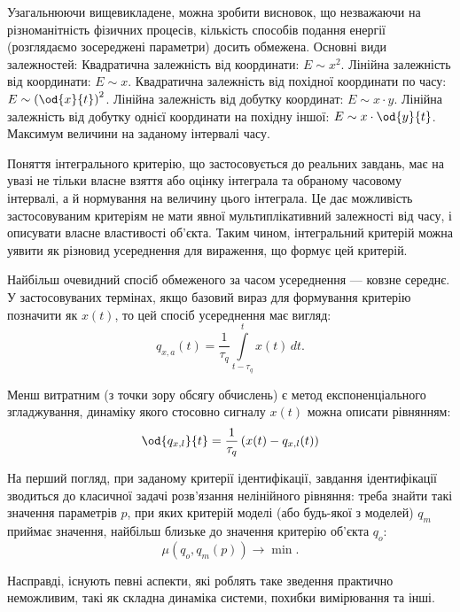 \documentclass[a4paper,13pt]{atuaref}
\begin{document}
Узагальнюючи вищевикладене, можна зробити висновок, що незважаючи на
різноманітність фізичних процесів, кількість способів подання енергії
(розглядаємо зосереджені параметри) досить обмежена. Основні види залежностей:
  Квадратична залежність від координати:
    $E \sim x^2$.
  Лінійна залежність від координати:
    $E \sim x$.
  Квадратична залежність від похідної координати по часу:
    $E \sim \left( \od{x}{t}\right)^2$.
  Лінійна залежність від добутку координат:
    $E \sim x \cdot y$.
    Лінійна залежність від добутку однієї координати на похідну іншої:
     $E \sim x \cdot \od{y}{t}$.
  Максимум величини на заданому інтервалі часу.

Поняття інтегрального критерію, що застосовується до реальних завдань, має на
увазі не тільки власне взяття або оцінку інтеграла та обраному часовому
інтервалі, а й нормування на величину цього інтеграла. Це дає можливість
застосовуваним критеріям не мати явної мультиплікативний залежності від часу, і
описувати власне властивості об'єкта. Таким чином, інтегральний критерій можна
уявити як різновид усереднення для вираження, що формує цей критерій.

Найбільш очевидний спосіб обмеженого за часом усереднення --- ковзне середнє. У
застосовуваних термінах, якщо базовий вираз для формування критерію позначити як
$ x(t)$, то цей спосіб усереднення має вигляд:
%
\begin{equation}
  q_{x,a}(t) =
  \frac{1}{\tau_q}
  \int\limits_{t-\tau_q}^{t} x(t) \, dt.
  \label{atu:eq:moving_avarage}
\end{equation}

Менш витратним (з точки зору обсягу обчислень) є метод експоненціального
згладжування, динаміку якого стосовно сигналу $x(t) $ можна описати
рівнянням:
%
\begin{equation}
\od{q_{x,l}}{t}
=
\frac{1}{\tau_q} \left( x(t) - q_{x,l}(t) \right)
\label{atu:eq:qlin}
\end{equation}

На перший погляд, при заданому критерії ідентифікації, завдання ідентифікації
зводиться до класичної задачі розв'язання нелінійного рівняння: треба знайти
такі значення параметрів $ p $, при яких критерій моделі (або будь-якої з
моделей) $ q_m $ приймає значення, найбільш близьке до значення критерію
об'єкта $ q_o $:
\[
  \mu( q_o, q_m(p) ) \to \min.
\]

Насправді, існують певні аспекти, які роблять таке зведення практично
неможливим, такі як складна динаміка системи, похибки вимірювання та інші.
\end{document}

